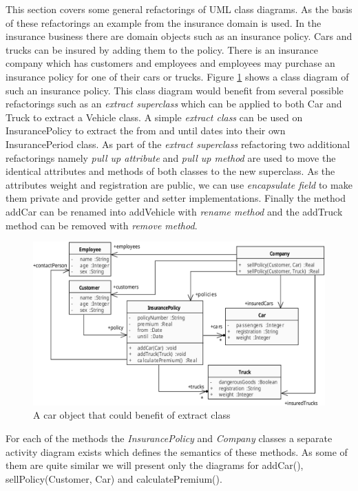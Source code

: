 \documentclass{llncs}
\begin{document}
This section covers some general refactorings of UML class diagrams. As the basis of these refactorings an example from the insurance
domain is used. In the insurance business there are domain objects such as an insurance policy. Cars and trucks can be insured by 
adding them to the policy. There is an insurance company which has customers and employees and employees may purchase an insurance policy 
for one of their cars or trucks. Figure \ref{fig:classdiagramcomplex} shows a class diagram of such an insurance policy. This class 
diagram would benefit from several possible refactorings such as an \textit{extract superclass} which can be applied to both Car and Truck 
to extract a Vehicle class. A simple \textit{extract class} can be used on InsurancePolicy to extract the from and until dates into their
own InsurancePeriod class. As part of the \textit{extract superclass} refactoring two additional refactorings namely \textit{pull up 
attribute} and \textit{pull up method} are used to move the identical attributes and methods of both classes to the new superclass. As the 
attributes weight and registration are public, we can use \textit{encapsulate field} to make them private and provide getter and setter 
implementations. Finally the method addCar can be renamed into addVehicle with \textit{rename method} and the addTruck method can be 
removed with \textit{remove method}.

\begin{figure}[h!t]
 \centering
 \includegraphics[scale=0.7]{images/ClassDiagramComplex.pdf}
 \caption{A car object that could benefit of extract class}
 \label{fig:classdiagramcomplex}
\end{figure}

For each of the methods the \textit{InsurancePolicy} and \textit{Company} classes a separate activity diagram exists which defines the
semantics of these methods. As some of them are quite similar we will present only the diagrams for addCar(), sellPolicy(Customer, Car) and calculatePremium().
\end{document}
